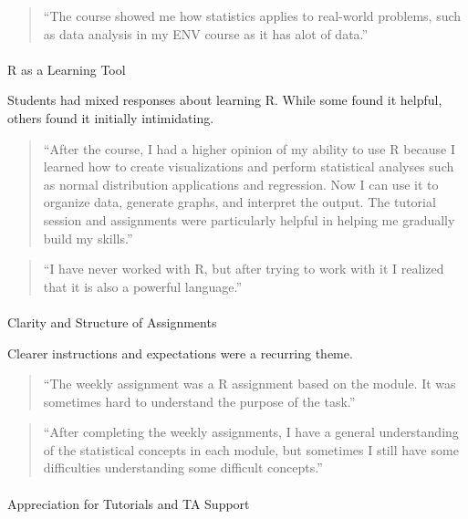 \documentclass[
  letterpaper,
  DIV=11,
  numbers=noendperiod]{scrartcl}
\makeatletter
\let\oldparagraph\paragraph
\renewcommand{\paragraph}{
    \@ifstar
      \xxxParagraphStar
      \xxxParagraphNoStar
  }
\newcommand{\xxxParagraphStar}[1]{\oldparagraph*{#1}\mbox{}}
\newcommand{\xxxParagraphNoStar}[1]{\oldparagraph{#1}\mbox{}}
\makeatother
\begin{document}
\begin{quote}
``The course showed me how statistics applies to real-world problems,
such as data analysis in my ENV course as it has alot of data.''
\end{quote}

\paragraph{R as a Learning Tool}\label{r-as-a-learning-tool}

Students had mixed responses about learning R. While some found it
helpful, others found it initially intimidating.

\begin{quote}
``After the course, I had a higher opinion of my ability to use R
because I learned how to create visualizations and perform statistical
analyses such as normal distribution applications and regression. Now I
can use it to organize data, generate graphs, and interpret the output.
The tutorial session and assignments were particularly helpful in
helping me gradually build my skills.''
\end{quote}

\begin{quote}
``I have never worked with R, but after trying to work with it I
realized that it is also a powerful language.''
\end{quote}

\paragraph{Clarity and Structure of
Assignments}\label{clarity-and-structure-of-assignments}

Clearer instructions and expectations were a recurring theme.

\begin{quote}
``The weekly assignment was a R assignment based on the module. It was
sometimes hard to understand the purpose of the task.''
\end{quote}

\begin{quote}
``After completing the weekly assignments, I have a general
understanding of the statistical concepts in each module, but sometimes
I still have some difficulties understanding some difficult concepts.''
\end{quote}

\paragraph{Appreciation for Tutorials and TA
Support}\label{appreciation-for-tutorials-and-ta-support}
\end{document}
